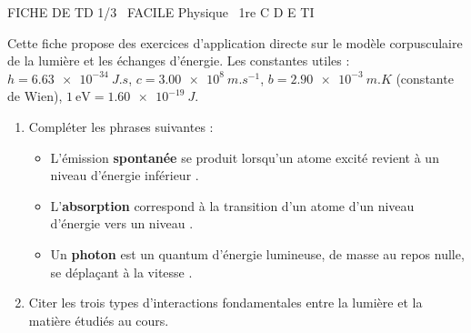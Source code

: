 \documentclass[11pt]{article}
\begin{document}
\begin{tcolorbox}[enhanced,colback=popink,colframe=popink,arc=10pt,boxrule=0pt,left=12pt,right=12pt,top=9pt,bottom=9pt]
{\color{white}\popxbold\small FICHE DE TD 1/3 \textbullet\ FACILE \hfill Physique \textbullet\ 1re C D E TI\par}
\end{tcolorbox}
\vspace{4pt}
Cette fiche propose des exercices d'application directe sur le modèle corpusculaire de la lumière et les échanges d'énergie. Les constantes utiles : $h = \SI{6,63e-34}{J.s}$, $c = \SI{3,00e8}{m.s^{-1}}$, $b = \SI{2,90e-3}{m.K}$ (constante de Wien), $1~\text{eV} = \SI{1,60e-19}{J}$.

\begin{exercice}
\begin{enumerate}
    \item Compléter les phrases suivantes :
    \begin{itemize}
        \item L'émission \textbf{spontanée} se produit lorsqu'un atome excité revient à un niveau d'énergie inférieur \underline{\hspace{4cm}}.
        \item L'\textbf{absorption} correspond à la transition d'un atome d'un niveau d'énergie \underline{\hspace{3cm}} vers un niveau \underline{\hspace{3cm}}.
        \item Un \textbf{photon} est un quantum d'énergie lumineuse, de masse au repos nulle, se déplaçant à la vitesse \underline{\hspace{2cm}}.
    \end{itemize}
    \item Citer les trois types d'interactions fondamentales entre la lumière et la matière étudiés au cours.
\end{enumerate}
\end{exercice}
\end{document}
